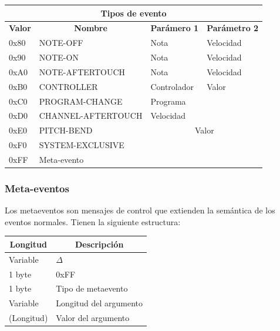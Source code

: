 \begin{center}
	\begin{tabular}{|l|l|l|l|}
		\hline \multicolumn{4}{|c|}{\textbf{Tipos de evento}} \\
		\hline \multicolumn{1}{|c|}{\textbf{Valor}} & \multicolumn{1}{c|}{\textbf{Nombre}} & \multicolumn{1}{c|}{\textbf{Parámero 1}} & \multicolumn{1}{c|}{\textbf{Parámetro 2}} \\
		\hline 0x80 & NOTE-OFF & Nota & Velocidad \\
		\hline 0x90 & NOTE-ON & Nota & Velocidad \\
		\hline 0xA0 & NOTE-AFTERTOUCH & Nota & Velocidad \\
		\hline 0xB0 & CONTROLLER & Controlador & Valor \\
		\hline 0xC0 & PROGRAM-CHANGE & Programa &  \\
		\hline 0xD0 & CHANNEL-AFTERTOUCH & Velocidad &  \\
		\hline 0xE0 & PITCH-BEND & \multicolumn{2}{c|}{Valor} \\
		\hline 0xF0 & SYSTEM-EXCLUSIVE & \multicolumn{2}{c|}{} \\
		\hline 0xFF & Meta-evento & \multicolumn{2}{c|}{} \\
		\hline 
	\end{tabular}
	\smallskip
\end{center}

\smallskip

\subsubsection{Meta-eventos}

Los metaeventos son mensajes de control que extienden la semántica de los eventos normales. Tienen la siguiente estructura:

\smallskip

\begin{center}
	\begin{tabular}{|l|l|}
		\hline \multicolumn{1}{|c|}{\textbf{Longitud}} & \multicolumn{1}{c|}{\textbf{Descripción}} \\
		\hline Variable & $\Delta$ \\ 
		\hline 1 byte & 0xFF \\
		\hline 1 byte & Tipo de metaevento \\
		\hline Variable & Longitud del argumento \\ 
		\hline (Longitud) & Valor del argumento \\ 
		\hline
	\end{tabular}
	\smallskip
\end{center}

